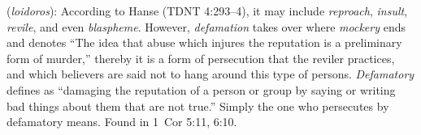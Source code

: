 \item[Defamatory,]

(\textit{loidoros}):
According to Hanse (TDNT 4:293--4), it may include \emph{reproach}, \emph{insult}, \emph{revile}, and even \emph{blaspheme}. However, \emph{defamation} takes over where \emph{mockery} ends and denotes ``The idea that abuse which injures the reputation is a preliminary form of murder,'' thereby it is a form of persecution that the reviler practices, and which believers are said not to hang around this type of persons. \emph{Defamatory} defines as ``damaging the reputation of a person or group by saying or writing bad things about them that are not true.'' Simply the one who persecutes by defamatory means.
Found in 1~Cor 5:11, 6:10.
